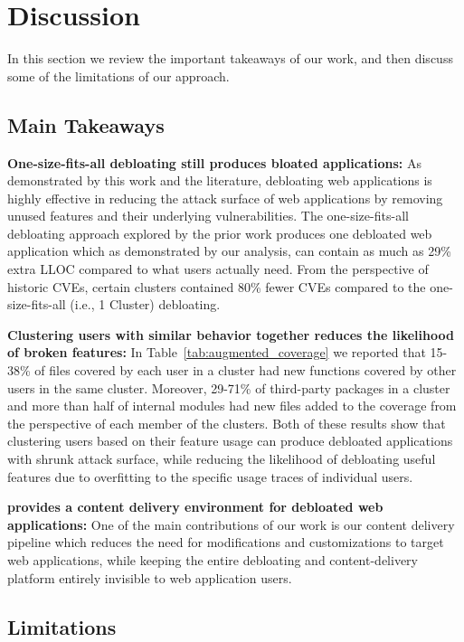 \section{Discussion}

In this section we review the important takeaways of our work, and then discuss some of the limitations of our approach.

\subsection{Main Takeaways}

\noindent\textbf{One-size-fits-all debloating still produces bloated applications:} 
As demonstrated by this work and the literature, debloating web applications is highly effective in reducing the attack surface of web applications by removing unused features and their underlying vulnerabilities. 
The one-size-fits-all debloating approach explored by the prior work produces one debloated web application which as demonstrated by our analysis, can contain as much as 29\% extra LLOC compared to what users actually need. 
From the perspective of historic CVEs, certain clusters contained 80\% fewer CVEs compared to the one-size-fits-all (i.e., 1 Cluster) debloating. 

\noindent\textbf{Clustering users with similar behavior together reduces the likelihood of broken features:} 
In Table~\ref{tab:augmented_coverage} we reported that 15-38\% of files covered by each user in a cluster had new functions covered by other users in the same cluster. 
Moreover, 29-71\% of third-party packages in a cluster and more than half of internal modules had new files added to the coverage from the perspective of each member of the clusters. 
Both of these results show that clustering users based on their feature usage can produce debloated applications with shrunk attack surface, while reducing the likelihood of debloating useful features due to overfitting to the specific usage traces of individual users. 

\noindent\textbf{\sys{} provides a content delivery environment for debloated web applications:} 
One of the main contributions of our work is our content delivery pipeline which reduces the need for modifications and customizations to target web applications, while keeping the entire debloating and content-delivery platform entirely invisible to web application users.

\subsection{Limitations} 

